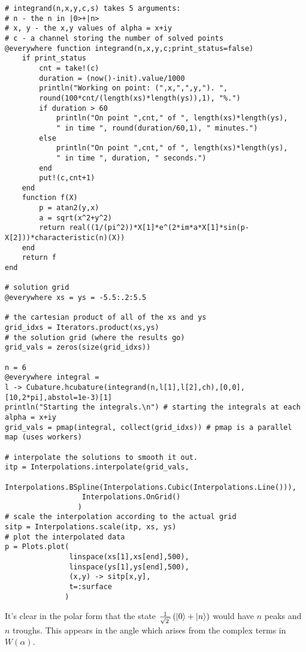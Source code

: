\begin{homeworkProblem}
\begin{verbatim}
# integrand(n,x,y,c,s) takes 5 arguments:
# n - the n in |0>+|n>
# x, y - the x,y values of alpha = x+iy
# c - a channel storing the number of solved points
@everywhere function integrand(n,x,y,c;print_status=false)
    if print_status
        cnt = take!(c)
        duration = (now()-init).value/1000
        println("Working on point: (",x,",",y,"). ",
        round(100*cnt/(length(xs)*length(ys)),1), "%.")
        if duration > 60
            println("On point ",cnt," of ", length(xs)*length(ys),
            " in time ", round(duration/60,1), " minutes.")
        else
            println("On point ",cnt," of ", length(xs)*length(ys),
            " in time ", duration, " seconds.")
        end
        put!(c,cnt+1)
    end
    function f(X)
        p = atan2(y,x)
        a = sqrt(x^2+y^2)
        return real((1/(pi^2))*X[1]*e^(2*im*a*X[1]*sin(p-X[2]))*characteristic(n)(X))
    end
    return f
end

# solution grid
@everywhere xs = ys = -5.5:.2:5.5

# the cartesian product of all of the xs and ys
grid_idxs = Iterators.product(xs,ys)
# the solution grid (where the results go)
grid_vals = zeros(size(grid_idxs))

n = 6
@everywhere integral =
l -> Cubature.hcubature(integrand(n,l[1],l[2],ch),[0,0],[10,2*pi],abstol=1e-3)[1]
println("Starting the integrals.\n") # starting the integrals at each alpha = x+iy
grid_vals = pmap(integral, collect(grid_idxs)) # pmap is a parallel map (uses workers)

# interpolate the solutions to smooth it out.
itp = Interpolations.interpolate(grid_vals,
                  Interpolations.BSpline(Interpolations.Cubic(Interpolations.Line())),
                  Interpolations.OnGrid()
                 )
# scale the interpolation according to the actual grid
sitp = Interpolations.scale(itp, xs, ys)
# plot the interpolated data
p = Plots.plot(
               linspace(xs[1],xs[end],500),
               linspace(ys[1],ys[end],500),
               (x,y) -> sitp[x,y],
               t=:surface
              )
    \end{verbatim}
    It's clear in the polar form that the state $ \frac{1}{\sqrt{2}} \left(
    \ket{0} + \ket{n} \right) $ would have $ n $ peaks and $ n $ troughs. This
    appears in the angle which arises from the complex terms in $ W(\alpha) $.
\end{homeworkProblem}
